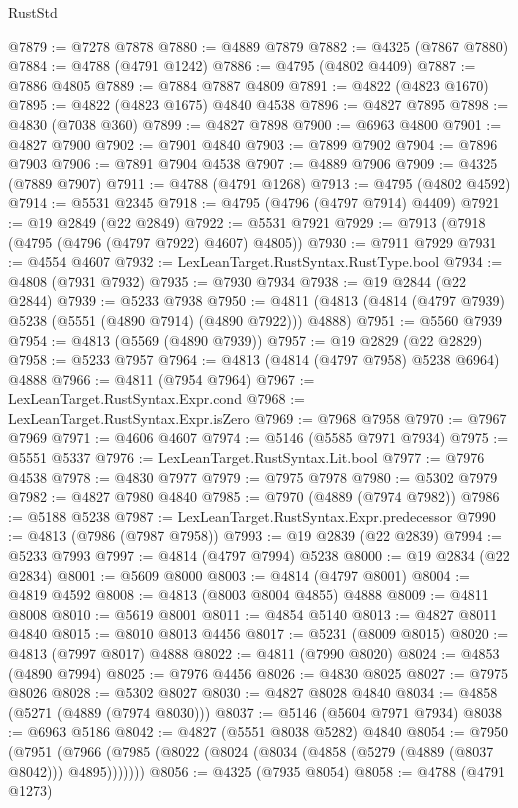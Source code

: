\begin{lexlean}{RustStd}
\begin{coremodule}
@7879 := @7278 @7878
@7880 := @4889 @7879
@7882 := @4325 (@7867 @7880)
@7884 := @4788 (@4791 @1242)
@7886 := @4795 (@4802 @4409)
@7887 := @7886 @4805
@7889 := @7884 @7887 @4809
@7891 := @4822 (@4823 @1670)
@7895 := @4822 (@4823 @1675) @4840 @4538
@7896 := @4827 @7895
@7898 := @4830 (@7038 @360)
@7899 := @4827 @7898
@7900 := @6963 @4800
@7901 := @4827 @7900
@7902 := @7901 @4840
@7903 := @7899 @7902
@7904 := @7896 @7903
@7906 := @7891 @7904 @4538
@7907 := @4889 @7906
@7909 := @4325 (@7889 @7907)
@7911 := @4788 (@4791 @1268)
@7913 := @4795 (@4802 @4592)
@7914 := @5531 @2345
@7918 := @4795 (@4796 (@4797 @7914) @4409)
@7921 := @19 @2849 (@22 @2849)
@7922 := @5531 @7921
@7929 := @7913 (@7918 (@4795 (@4796 (@4797 @7922) @4607) @4805))
@7930 := @7911 @7929
@7931 := @4554 @4607
@7932 := LexLeanTarget.RustSyntax.RustType.bool
@7934 := @4808 (@7931 @7932)
@7935 := @7930 @7934
@7938 := @19 @2844 (@22 @2844)
@7939 := @5233 @7938
@7950 := @4811 (@4813 (@4814 (@4797 @7939) @5238 (@5551 (@4890 @7914) (@4890 @7922))) @4888)
@7951 := @5560 @7939
@7954 := @4813 (@5569 (@4890 @7939))
@7957 := @19 @2829 (@22 @2829)
@7958 := @5233 @7957
@7964 := @4813 (@4814 (@4797 @7958) @5238 @6964) @4888
@7966 := @4811 (@7954 @7964)
@7967 := LexLeanTarget.RustSyntax.Expr.cond
@7968 := LexLeanTarget.RustSyntax.Expr.isZero
@7969 := @7968 @7958
@7970 := @7967 @7969
@7971 := @4606 @4607
@7974 := @5146 (@5585 @7971 @7934)
@7975 := @5551 @5337
@7976 := LexLeanTarget.RustSyntax.Lit.bool
@7977 := @7976 @4538
@7978 := @4830 @7977
@7979 := @7975 @7978
@7980 := @5302 @7979
@7982 := @4827 @7980 @4840
@7985 := @7970 (@4889 (@7974 @7982))
@7986 := @5188 @5238
@7987 := LexLeanTarget.RustSyntax.Expr.predecessor
@7990 := @4813 (@7986 (@7987 @7958))
@7993 := @19 @2839 (@22 @2839)
@7994 := @5233 @7993
@7997 := @4814 (@4797 @7994) @5238
@8000 := @19 @2834 (@22 @2834)
@8001 := @5609 @8000
@8003 := @4814 (@4797 @8001)
@8004 := @4819 @4592
@8008 := @4813 (@8003 @8004 @4855) @4888
@8009 := @4811 @8008
@8010 := @5619 @8001
@8011 := @4854 @5140
@8013 := @4827 @8011 @4840
@8015 := @8010 @8013 @4456
@8017 := @5231 (@8009 @8015)
@8020 := @4813 (@7997 @8017) @4888
@8022 := @4811 (@7990 @8020)
@8024 := @4853 (@4890 @7994)
@8025 := @7976 @4456
@8026 := @4830 @8025
@8027 := @7975 @8026
@8028 := @5302 @8027
@8030 := @4827 @8028 @4840
@8034 := @4858 (@5271 (@4889 (@7974 @8030)))
@8037 := @5146 (@5604 @7971 @7934)
@8038 := @6963 @5186
@8042 := @4827 (@5551 @8038 @5282) @4840
@8054 := @7950
    (@7951 (@7966 (@7985 (@8022 (@8024 (@8034 (@4858 (@5279 (@4889 (@8037 @8042))) @4895)))))))
@8056 := @4325 (@7935 @8054)
@8058 := @4788 (@4791 @1273)

\end{coremodule}
\end{lexlean}
